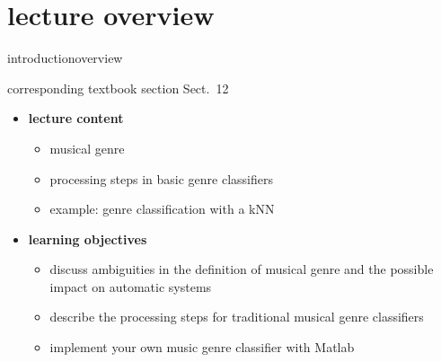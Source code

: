 


\subtitle{Module 12: Musical Genre Classification}


	

    \section[overview]{lecture overview}
        \begin{frame}{introduction}{overview}
            \begin{block}{corresponding textbook section}
                    Sect.~12
            \end{block}

            \begin{itemize}
                \item   \textbf{lecture content}
                    \begin{itemize}
                        \item   musical genre
                        \item   processing steps in basic genre classifiers
                        \item   example: genre classification with a kNN
                    \end{itemize}
                \bigskip
                \item<2->   \textbf{learning objectives}
                    \begin{itemize}
                        \item   discuss ambiguities in the definition of musical genre and the possible impact on automatic systems
                        \item   describe the processing steps for traditional musical genre classifiers
                        \item   implement your own music genre classifier with Matlab
                    \end{itemize}
            \end{itemize}
        \end{frame}


